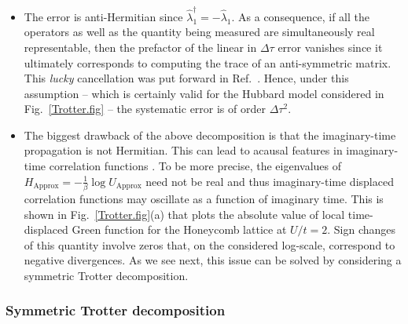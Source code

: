 \begin{itemize}
\item    The error is anti-Hermitian  since $\hat{\lambda}_1^{\dagger} = - \hat{\lambda}_1 $. As a consequence, if all the operators as well as the quantity being measured are simultaneously real representable,  then   the prefactor of the linear in $\Delta  \tau$ error vanishes since it ultimately corresponds to computing the trace of an  anti-symmetric matrix. This \textit{lucky}   cancellation was put forward in  Ref.~\cite{Fye86}.   Hence, under this assumption -- which is certainly valid for the Hubbard model considered in Fig.~\ref{Trotter.fig} -- the systematic error is of order $\Delta \tau^2$.
\item  The biggest drawback  of the above decomposition is that  the imaginary-time propagation is not Hermitian.   This can lead to acausal  features in imaginary-time correlation functions \cite{Beyl_thesis}. To be more precise, the eigenvalues of  
$  H_{\text{Approx}} = - \frac{1}{\beta} \log  U_{\text{Approx}}$ need not be real and thus imaginary-time displaced correlation functions may oscillate as a function of imaginary time.   
This is shown in  Fig.~\ref{Trotter.fig}(a)  that plots the  absolute value of local time-displaced Green function for  the Honeycomb lattice at $U/t=2$.  Sign changes of this quantity   involve zeros  that, on the considered log-scale,  correspond to negative divergences.
As we see next, this issue can be solved by considering a symmetric  Trotter decomposition. 
\end{itemize}


\subsubsection{ Symmetric Trotter decomposition } 

